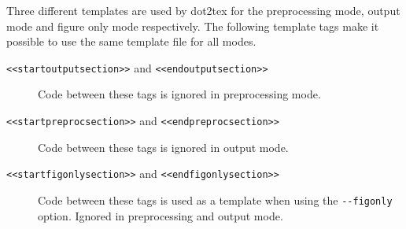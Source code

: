 \documentclass[10pt,a4paper,english]{article}
\newlength{\admonitionwidth}
\begin{document}
Three different templates are used by dot2tex for the preprocessing mode, output mode and figure only mode respectively. The following template tags make it possible to use the same template file for all modes.
\begin{description}
\item[{\texttt{<{}<startoutputsection>{}>} and \texttt{<{}<endoutputsection>{}>}}] \leavevmode 
Code between these tags is ignored in preprocessing mode.

\item[{\texttt{<{}<startpreprocsection>{}>} and \texttt{<{}<endpreprocsection>{}>}}] \leavevmode 
Code between these tags is ignored in output mode.

\item[{\texttt{<{}<startfigonlysection>{}>} and \texttt{<{}<endfigonlysection>{}>}}] \leavevmode 
Code between these tags is used as a template when using the \texttt{-{}-figonly} option. Ignored in preprocessing and output mode.

\end{description}
\begin{center}\begin{sffamily}
\end{sffamily}
\end{center}



\hypertarget{default-pgf-tikz-template}{}
\end{document}
